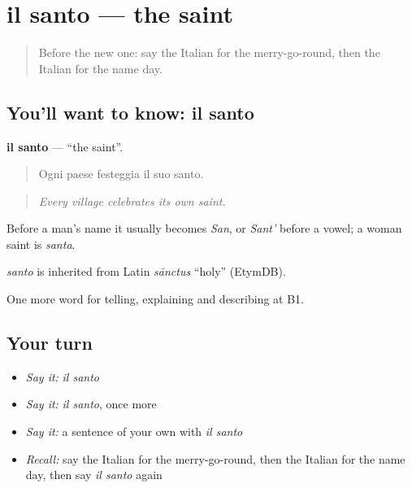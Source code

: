 \section[il santo]{il santo — the saint}

\label{lesson:IT-C320-santo}



\begin{quote}
Before the new one: say the Italian for the merry-go-round, then the Italian for the name day.
\end{quote}

\subsection*{You'll want to know: il santo}
\textbf{il santo} — \textquotedblleft{}the saint\textquotedblright{}.

\begin{quote}
Ogni paese festeggia il suo santo.
\end{quote}

\begin{quote}
\emph{Every village celebrates its own saint.}
\end{quote}

Before a man's name it usually becomes \emph{San}, or \emph{Sant'} before a vowel; a woman saint is \emph{santa}.

\begin{cousinweb}
\emph{santo} is inherited from Latin \emph{sānctus} \textquotedblleft{}holy\textquotedblright{} (EtymDB).
\end{cousinweb}

\begin{grammarlens}[title={What you've built}]
One more word for telling, explaining and describing at B1.
\end{grammarlens}

\subsection*{Your turn}
\begin{itemize}
\raggedright
  \item \emph{Say it:} \emph{il santo}
  \item \emph{Say it:} \emph{il santo}, once more
  \item \emph{Say it:} a sentence of your own with \emph{il santo}
  \item \emph{Recall:} say the Italian for the merry-go-round, then the Italian for the name day, then say \emph{il santo} again
\end{itemize}

